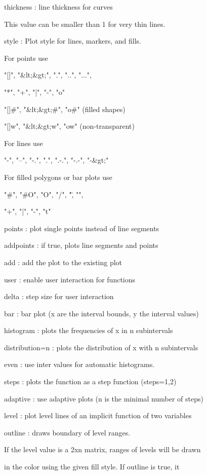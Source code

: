 \documentclass{article}
\begin{document}
thickness : line thickness for curves


            This value can be smaller than 1 for very thin lines.


style     : Plot style for lines, markers, and fills.


            For points use


            "[]", "&lt;&gt;", ".", "..", "...",


            "*", "+", "|", "-", "o"


            "[]#", "&lt;&gt;#", "o#" (filled shapes)


            "[]w", "&lt;&gt;w", "ow" (non-transparent)


            For lines use


            "-", "--", "-.", ".", ".-.", "-.-", "-&gt;"


            For filled polygons or bar plots use


            "#", "#O", "O", "/", "\", "\/",


            "+", "|", "-", "t"


points    : plot single points instead of line segments


addpoints : if true, plots line segments and points


add       : add the plot to the existing plot


user      : enable user interaction for functions


delta     : step size for user interaction


bar       : bar plot (x are the interval bounds, y the interval values)


histogram : plots the frequencies of x in n subintervals


distribution=n : plots the distribution of x with n subintervals


even      : use inter values for automatic histograms.


steps     : plots the function as a step function (steps=1,2)


adaptive  : use adaptive plots (n is the minimal number of steps)


level     : plot level lines of an implicit function of two variables


outline   : draws boundary of level ranges.




If the level value is a 2xn matrix, ranges of levels will be drawn


in the color using the given fill style. If outline is true, it
\end{document}
